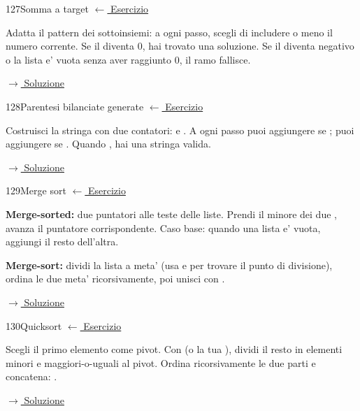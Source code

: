 \label{hint:127}
\begin{hintbox}{127}{Somma a target}
\small\color{black!55}\hyperref[ex:127]{$\leftarrow$ Esercizio}\normalsize\color{black}

Adatta il pattern dei sottoinsiemi: a ogni passo, scegli
di includere o meno il numero corrente.
Se il  diventa 0, hai trovato una soluzione.
Se il  diventa negativo o la lista e' vuota
senza aver raggiunto 0, il ramo fallisce.

\small\color{black!55}\hyperref[sol:127]{$\rightarrow$ Soluzione}\normalsize\color{black}
\end{hintbox}

\label{hint:128}
\begin{hintbox}{128}{Parentesi bilanciate generate}
\small\color{black!55}\hyperref[ex:128]{$\leftarrow$ Esercizio}\normalsize\color{black}

Costruisci la stringa con due contatori:  e .
A ogni passo puoi aggiungere \fn{(} se ;
puoi aggiungere \fn{)} se .
Quando , hai una stringa valida.

\small\color{black!55}\hyperref[sol:128]{$\rightarrow$ Soluzione}\normalsize\color{black}
\end{hintbox}

\label{hint:129}
\begin{hintbox}{129}{Merge sort}
\small\color{black!55}\hyperref[ex:129]{$\leftarrow$ Esercizio}\normalsize\color{black}

\textbf{Merge-sorted:} due puntatori alle teste delle liste.
Prendi il minore dei due , avanza il puntatore corrispondente.
Caso base: quando una lista e' vuota, aggiungi il resto dell'altra.

\textbf{Merge-sort:} dividi la lista a meta' (usa  e
 per trovare il punto di divisione),
ordina le due meta' ricorsivamente, poi unisci con .

\small\color{black!55}\hyperref[sol:129]{$\rightarrow$ Soluzione}\normalsize\color{black}
\end{hintbox}

\label{hint:130}
\begin{hintbox}{130}{Quicksort}
\small\color{black!55}\hyperref[ex:130]{$\leftarrow$ Esercizio}\normalsize\color{black}

Scegli il primo elemento come pivot.
Con  (o la tua ), dividi
il resto in elementi minori e maggiori-o-uguali al pivot.
Ordina ricorsivamente le due parti e concatena:
.

\small\color{black!55}\hyperref[sol:130]{$\rightarrow$ Soluzione}\normalsize\color{black}
\end{hintbox}

